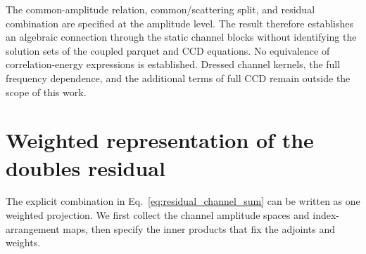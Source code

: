 \documentclass[aip,jcp,reprint,noshowkeys,superscriptaddress]{revtex4-1}
\begin{document}
The common-amplitude relation, common/scattering split, and residual
combination are specified at the amplitude level. The result therefore
establishes an algebraic connection through the static channel blocks without
identifying the solution sets of the coupled parquet and CCD equations.
No equivalence of correlation-energy expressions is established. Dressed
channel kernels, the full frequency dependence, and the additional terms
of full CCD remain outside the scope of this work.

\appendix
\section{Weighted representation of the doubles residual}
\label{app:weighted_projection}

The explicit combination in Eq.~\eqref{eq:residual_channel_sum} can be
written as one weighted projection. We first collect the channel amplitude
spaces and index-arrangement maps, then specify the inner products that
fix the adjoints and weights.
\end{document}
